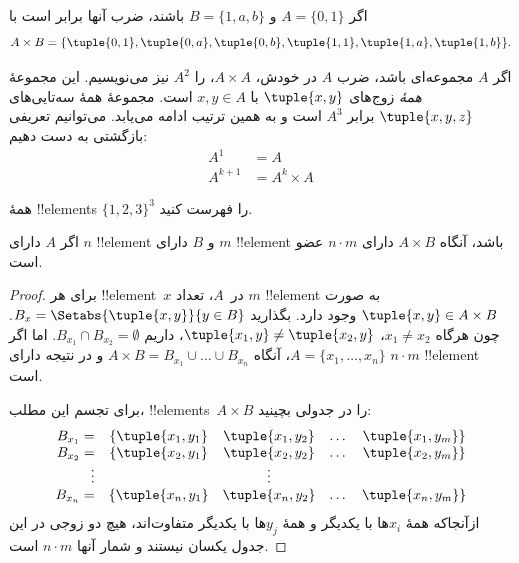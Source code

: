 \documentclass[../../../include/open-logic-section]{subfiles}
\begin{document}
\begin{ex}
اگر $A = \{0, 1\}$ و $B = \{1, a, b\}$ باشند، ضرب آنها برابر است با
\[
A \times B = \{ \tuple{0, 1}, \tuple{0, a}, \tuple{0, b},
    \tuple{1, 1}, \tuple{1, a}, \tuple{1, b} \}.
\]
\end{ex}

\begin{ex}
اگر $A$ مجموعه‌ای باشد، ضرب $A$ در خودش، $A \times A$، را
$A^2$ نیز می‌نویسیم. این مجموعهٔ \emph{همهٔ} زوج‌های $\tuple{x, y}$
با $x, y \in A$ است. مجموعهٔ همهٔ سه‌تایی‌های $\tuple{x, y, z}$
برابر $A^3$ است و به همین ترتیب ادامه می‌یابد. می‌توانیم تعریفی
بازگشتی به دست دهیم:
\begin{align*}
  A^1 & = A\\
  A^{k+1} & = A^k \times A
\end{align*}
\end{ex}

\begin{prob}
همهٔ !!{element}s $\{1, 2, 3\}^3$ را فهرست کنید.
\end{prob}

\begin{prop}
اگر $A$ دارای $n$ !!{element} و $B$ دارای $m$ !!{element} باشد،
آنگاه $A \times B$ دارای $n\cdot m$ عضو است.
\end{prop}

\begin{proof}
برای هر !!{element}~$x$ در~$A$، تعداد $m$ !!{element} به صورت
$\tuple{x, y} \in A \times B$ وجود دارد. بگذارید
$B_x = \Setabs{\tuple{x, y}}{y \in B}$. چون هرگاه $x_1 \neq x_2$،
$\tuple{x_1, y} \neq \tuple{x_2, y}$، داریم
$B_{x_1} \cap B_{x_2} = \emptyset$. اما اگر
$A = \{x_1, \dots, x_n\}$، آنگاه
$A \times B = B_{x_1} \cup \dots \cup B_{x_n}$ و در نتیجه دارای
$n\cdot m$ !!{element} است.

برای تجسم این مطلب، !!{element}s~$A \times B$ را در جدولی بچینید:
\[
\begin{array}{rcccc}
  B_{x_1} = & \{\tuple{x_1, y_1} & \tuple{x_1, y_2} & \dots & \tuple{x_1, y_m}\}\\
  B_{x_2} = & \{\tuple{x_2, y_1} & \tuple{x_2, y_2} & \dots & \tuple{x_2, y_m}\}\\
  \vdots & & \vdots\\
  B_{x_n} = & \{\tuple{x_n, y_1} & \tuple{x_n, y_2} & \dots & \tuple{x_n, y_m}\}
\end{array}
\]
ازآنجاکه همهٔ $x_i$ها با یکدیگر و همهٔ $y_j$ها با یکدیگر متفاوت‌اند،
هیچ دو زوجی در این جدول یکسان نیستند و شمار آنها $n\cdot m$ است.
\end{proof}
\end{document}
